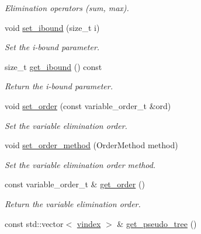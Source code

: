 \begin{DoxyCompactItemize}
\begin{DoxyCompactList}\small\item\em Elimination operators (sum, max). \end{DoxyCompactList}\item 
void \hyperlink{classmerlin_1_1ijgp_a96bd81b7e90ec19825886c83ddfa96c8}{set\+\_\+ibound} (size\+\_\+t i)
\begin{DoxyCompactList}\small\item\em Set the i-\/bound parameter. \end{DoxyCompactList}\item 
size\+\_\+t \hyperlink{classmerlin_1_1ijgp_a8ed83bc7670ed66bbce5e7659031c8b8}{get\+\_\+ibound} () const \hypertarget{classmerlin_1_1ijgp_a8ed83bc7670ed66bbce5e7659031c8b8}{}\label{classmerlin_1_1ijgp_a8ed83bc7670ed66bbce5e7659031c8b8}

\begin{DoxyCompactList}\small\item\em Return the i-\/bound parameter. \end{DoxyCompactList}\item 
void \hyperlink{classmerlin_1_1ijgp_a606c7c45f03321907581254e022ac449}{set\+\_\+order} (const variable\+\_\+order\+\_\+t \&ord)
\begin{DoxyCompactList}\small\item\em Set the variable elimination order. \end{DoxyCompactList}\item 
void \hyperlink{classmerlin_1_1ijgp_a0ef14c891c534a6b5b060921871d2c61}{set\+\_\+order\+\_\+method} (Order\+Method method)
\begin{DoxyCompactList}\small\item\em Set the variable elimination order method. \end{DoxyCompactList}\item 
const variable\+\_\+order\+\_\+t \& \hyperlink{classmerlin_1_1ijgp_a7deef61c7bbda358a1d0ecc6841cff81}{get\+\_\+order} ()\hypertarget{classmerlin_1_1ijgp_a7deef61c7bbda358a1d0ecc6841cff81}{}\label{classmerlin_1_1ijgp_a7deef61c7bbda358a1d0ecc6841cff81}

\begin{DoxyCompactList}\small\item\em Return the variable elimination order. \end{DoxyCompactList}\item 
const std\+::vector$<$ \hyperlink{classmerlin_1_1ijgp_a4c3416087411a776f76a630217515d94}{vindex} $>$ \& \hyperlink{classmerlin_1_1ijgp_a1677ea16e2146f488c0247dcb27278a4}{get\+\_\+pseudo\+\_\+tree} ()\hypertarget{classmerlin_1_1ijgp_a1677ea16e2146f488c0247dcb27278a4}{}\label{classmerlin_1_1ijgp_a1677ea16e2146f488c0247dcb27278a4}


\end{DoxyCompactItemize}

